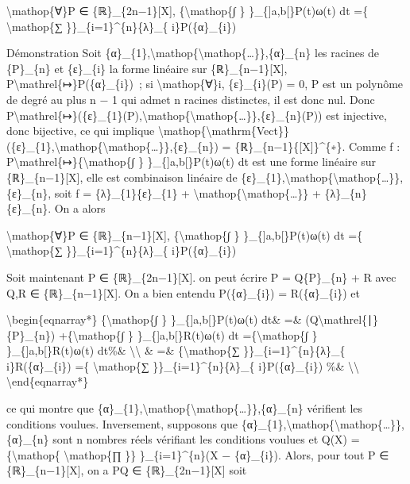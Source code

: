 \documentclass[]{article}
\begin{document}
\textbackslash{}mathop\{∀\}P ∈ \{ℝ\}\_\{2n−1\}{[}X{]},
\{\textbackslash{}mathop\{∫ \} \}\_\{{]}a,b{[}\}P(t)ω(t) dt =\{
\textbackslash{}mathop\{∑ \}\}\_\{i=1\}\^{}\{n\}\{λ\}\_\{
i\}P(\{α\}\_\{i\})

Démonstration Soit
\{α\}\_\{1\},\textbackslash{}mathop\{\textbackslash{}mathop\{\ldots{}\}\},\{α\}\_\{n\}
les racines de \{P\}\_\{n\} et \{ε\}\_\{i\} la forme linéaire sur
\{ℝ\}\_\{n−1\}{[}X{]}, P\textbackslash{}mathrel\{↦\}P(\{α\}\_\{i\})~; si
\textbackslash{}mathop\{∀\}i, \{ε\}\_\{i\}(P) = 0, P est un polynôme de
degré au plus n − 1 qui admet n racines distinctes, il est donc nul.
Donc
P\textbackslash{}mathrel\{↦\}(\{ε\}\_\{1\}(P),\textbackslash{}mathop\{\textbackslash{}mathop\{\ldots{}\}\},\{ε\}\_\{n\}(P))
est injective, donc bijective, ce qui implique
\textbackslash{}mathop\{\textbackslash{}mathrm\{Vect\}\}(\{ε\}\_\{1\},\textbackslash{}mathop\{\textbackslash{}mathop\{\ldots{}\}\},\{ε\}\_\{n\})
= \{ℝ\}\_\{n−1\}\{{[}X{]}\}\^{}\{∗\}. Comme f :
P\textbackslash{}mathrel\{↦\}\{\textbackslash{}mathop\{∫ \}
\}\_\{{]}a,b{[}\}P(t)ω(t) dt est une forme linéaire sur
\{ℝ\}\_\{n−1\}{[}X{]}, elle est combinaison linéaire de
\{ε\}\_\{1\},\textbackslash{}mathop\{\textbackslash{}mathop\{\ldots{}\}\},\{ε\}\_\{n\},
soit f = \{λ\}\_\{1\}\{ε\}\_\{1\} +
\textbackslash{}mathop\{\textbackslash{}mathop\{\ldots{}\}\} +
\{λ\}\_\{n\}\{ε\}\_\{n\}. On a alors

\textbackslash{}mathop\{∀\}P ∈ \{ℝ\}\_\{n−1\}{[}X{]},
\{\textbackslash{}mathop\{∫ \} \}\_\{{]}a,b{[}\}P(t)ω(t) dt =\{
\textbackslash{}mathop\{∑ \}\}\_\{i=1\}\^{}\{n\}\{λ\}\_\{
i\}P(\{α\}\_\{i\})

Soit maintenant P ∈ \{ℝ\}\_\{2n−1\}{[}X{]}. on peut écrire P =
Q\{P\}\_\{n\} + R avec Q,R ∈ \{ℝ\}\_\{n−1\}{[}X{]}. On a bien entendu
P(\{α\}\_\{i\}) = R(\{α\}\_\{i\}) et

\textbackslash{}begin\{eqnarray*\} \{\textbackslash{}mathop\{∫ \}
\}\_\{{]}a,b{[}\}P(t)ω(t) dt\& =\&
(Q\textbackslash{}mathrel\{∣\}\{P\}\_\{n\}) +\{\textbackslash{}mathop\{∫
\} \}\_\{{]}a,b{[}\}R(t)ω(t) dt =\{\textbackslash{}mathop\{∫ \}
\}\_\{{]}a,b{[}\}R(t)ω(t) dt\%\& \textbackslash{}\textbackslash{} \& =\&
\{\textbackslash{}mathop\{∑ \}\}\_\{i=1\}\^{}\{n\}\{λ\}\_\{
i\}R(\{α\}\_\{i\}) =\{ \textbackslash{}mathop\{∑
\}\}\_\{i=1\}\^{}\{n\}\{λ\}\_\{ i\}P(\{α\}\_\{i\}) \%\&
\textbackslash{}\textbackslash{} \textbackslash{}end\{eqnarray*\}

ce qui montre que
\{α\}\_\{1\},\textbackslash{}mathop\{\textbackslash{}mathop\{\ldots{}\}\},\{α\}\_\{n\}
vérifient les conditions voulues. Inversement, supposons que
\{α\}\_\{1\},\textbackslash{}mathop\{\textbackslash{}mathop\{\ldots{}\}\},\{α\}\_\{n\}
sont n nombres réels vérifiant les conditions voulues et Q(X)
=\{\textbackslash{}mathop\{ \textbackslash{}mathop\{∏ \}\}
\}\_\{i=1\}\^{}\{n\}(X − \{α\}\_\{i\}). Alors, pour tout P ∈
\{ℝ\}\_\{n−1\}{[}X{]}, on a PQ ∈ \{ℝ\}\_\{2n−1\}{[}X{]} soit
\end{document}
